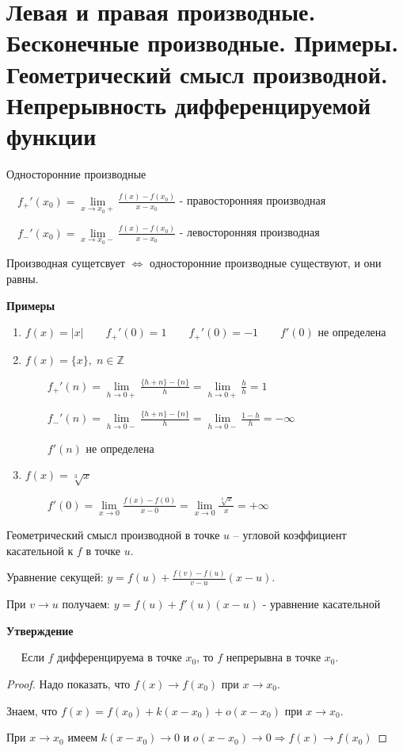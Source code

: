 \section{Левая и правая производные. Бесконечные производные. Примеры. Геометрический смысл производной. Непрерывность дифференцируемой функции \href{https://youtu.be/OXDjegAsmSU?t=1071}{\Walley}}
\begin{conj}
    Односторонние производные

    $\quad f_{+}'(x_0) = \lim\limits_{x \to x_0+} \frac{f(x) - f(x_0)}{x - x_0}$ - правосторонняя производная

    $\quad f_{-}'(x_0) = \lim\limits_{x \to x_0-} \frac{f(x) - f(x_0)}{x - x_0}$ - левосторонняя производная
\end{conj}
\begin{notice}
    Производная сущетсвует $\Leftrightarrow$ односторонние производные существуют, и они равны.
\end{notice}


\textbf{Примеры}
\begin{enumerate}
    \item $f(x) = |x| \quad\quad f_{+}'(0) = 1 \quad\quad f_{+}'(0) = -1 \quad\quad f'(0)$ не определена
    \item $f(x) = \{x\}, \; n \in \mathbb{Z}$
    
    $\quad\quad f_{+}'(n) = \lim\limits_{h \to 0+} \frac{\{h + n\} - \{n\}}{h} = \lim\limits_{h \to 0+} \frac{h}{h} = 1$

    $\quad\quad f_{-}'(n) = \lim\limits_{h \to 0-} \frac{\{h + n\} - \{n\}}{h} = \lim\limits_{h \to 0-} \frac{1 - h}{h} = -\infty$

    $\quad\quad f'(n)$ не определена
    \item  $f(x) = \sqrt[3]{x}$
    
    $\quad\quad f'(0) = \lim\limits_{x \to 0} \frac{f(x) - f(0)}{x - 0} = \lim\limits_{x \to 0} \frac{\sqrt[3]{x}}{x} = +\infty$
\end{enumerate}
\begin{conj}
    Геометрический смысл производной в точке $u$ -- угловой коэффициент касательной к $f$ в точке $u$.
\end{conj}
Уравнение секущей: $y = f(u) + \frac{f(v) - f(u)}{v - u}(x - u)$. 

При $v \to u$ получаем: $y = f(u) + f'(u)(x - u)$ - уравнение касательной


\textbf{Утверждение} 

$\quad$ Если $f$ дифференцируема в точке $x_0$, то $f$ непрерывна в точке $x_0$.
\begin{proof}
    Надо показать, что $f(x) \to f(x_0)$ при $x \to x_0$.  
    
    Знаем, что $f(x) = f(x_0) + k(x - x_0) + o(x - x_0)$ при $x \to x_0$. 

    При $x \to x_0$ имеем $k(x - x_0) \to 0$ и $o(x - x_0) \to 0 \Rightarrow f(x) \to f(x_0)$ 
\end{proof}